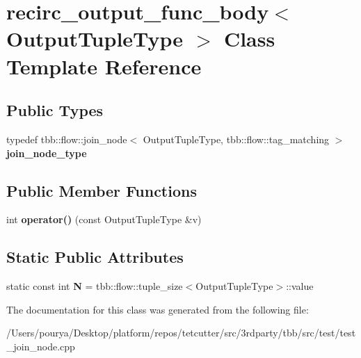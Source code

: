 \hypertarget{classrecirc__output__func__body}{}\section{recirc\+\_\+output\+\_\+func\+\_\+body$<$ Output\+Tuple\+Type $>$ Class Template Reference}
\label{classrecirc__output__func__body}
\subsection*{Public Types}
\begin{DoxyCompactItemize}
\item 
\hypertarget{classrecirc__output__func__body_abfbbf89e705b79ccb8e783bb3fc208ef}{}typedef tbb\+::flow\+::join\+\_\+node$<$ Output\+Tuple\+Type, tbb\+::flow\+::tag\+\_\+matching $>$ {\bfseries join\+\_\+node\+\_\+type}\label{classrecirc__output__func__body_abfbbf89e705b79ccb8e783bb3fc208ef}

\end{DoxyCompactItemize}
\subsection*{Public Member Functions}
\begin{DoxyCompactItemize}
\item 
\hypertarget{classrecirc__output__func__body_a0934dc504c3e0734499380417190858d}{}int {\bfseries operator()} (const Output\+Tuple\+Type \&v)\label{classrecirc__output__func__body_a0934dc504c3e0734499380417190858d}

\end{DoxyCompactItemize}
\subsection*{Static Public Attributes}
\begin{DoxyCompactItemize}
\item 
\hypertarget{classrecirc__output__func__body_ab6c2aba5442b233116a443efd7d18ffc}{}static const int {\bfseries N} = tbb\+::flow\+::tuple\+\_\+size$<$Output\+Tuple\+Type$>$\+::value\label{classrecirc__output__func__body_ab6c2aba5442b233116a443efd7d18ffc}

\end{DoxyCompactItemize}


The documentation for this class was generated from the following file\+:\begin{DoxyCompactItemize}
\item 
/\+Users/pourya/\+Desktop/platform/repos/tetcutter/src/3rdparty/tbb/src/test/test\+\_\+join\+\_\+node.\+cpp\end{DoxyCompactItemize}
